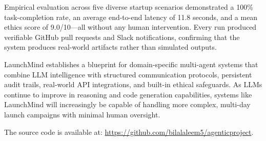 \documentclass[conference]{IEEEtran}
\begin{document}
Empirical evaluation across five diverse startup scenarios demonstrated a 100\% task-completion rate, an average end-to-end latency of 11.8 seconds, and a mean ethics score of 9.0/10—all without any human intervention. Every run produced verifiable GitHub pull requests and Slack notifications, confirming that the system produces real-world artifacts rather than simulated outputs.

LaunchMind establishes a blueprint for domain-specific multi-agent systems that combine LLM intelligence with structured communication protocols, persistent audit trails, real-world API integrations, and built-in ethical safeguards. As LLMs continue to improve in reasoning and code generation capabilities, systems like LaunchMind will increasingly be capable of handling more complex, multi-day launch campaigns with minimal human oversight.

The source code is available at: \url{https://github.com/bilalaleem5/agenticproject}.
\end{document}
